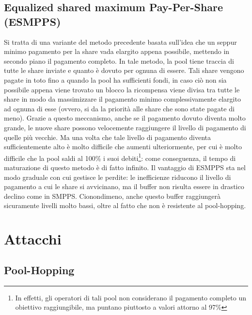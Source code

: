 \subsection{Equalized shared maximum Pay-Per-Share (ESMPPS)}

Si tratta di una variante del metodo precedente basata sull'idea che un seppur minimo pagamento per la share vada elargito appena possibile, mettendo in secondo piano il pagamento completo.
In tale metodo, la pool tiene traccia di tutte le share inviate e quanto è dovuto per ognuna di essere. Tali share vengono pagate in toto fino a quando la pool ha sufficienti fondi, in caso ciò non sia possibile appena viene trovato un blocco la ricompensa viene divisa tra tutte le share in modo da massimizzare il pagamento minimo complessivamente elargito ad ognuna di esse (ovvero, si da la priorità alle share che sono state pagate di meno).
Grazie a questo meccanismo, anche se il pagamento dovuto diventa molto grande, le nuove share possono velocemente raggiungere il livello di pagamento di quelle più vecchie. Ma una volta che tale livello di pagamento diventa sufficientemente alto è molto difficile che aumenti ulteriormente, per cui è molto difficile che la pool saldi al 100\% i suoi debiti\footnote{In effetti, gli operatori di tali pool non considerano il pagamento completo un obiettivo raggiungibile, ma puntano piuttosto a valori attorno al 97\%}: come conseguenza, il tempo di maturazione di questo metodo è di fatto infinito.
Il vantaggio di ESMPPS sta nel modo graduale con cui gestisce le perdite: le inefficienze riducono il livello di pagamento a cui le share si avvicinano, ma il buffer non risulta essere in drastico declino come in SMPPS. Cionondimeno, anche questo buffer raggiungerà sicuramente livelli molto bassi, oltre al fatto che non è resistente al pool-hopping.

\section{Attacchi}

\subsection{Pool-Hopping}


